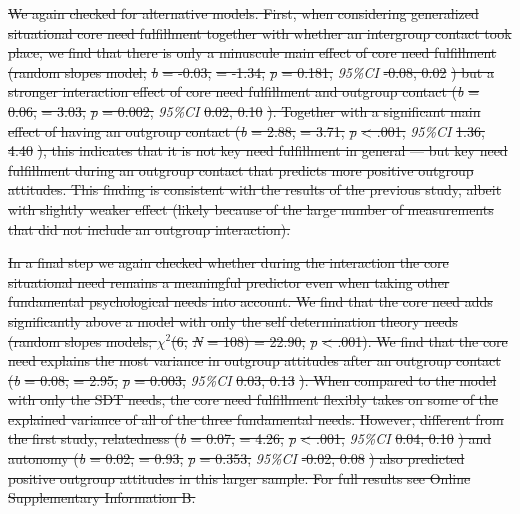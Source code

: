 \documentclass[man, 12pt, a4paper, mask]{apa7} %
\theoremstyle{break}
\theoremstyle{plain}
\providecommand{\DIFdeltex}[1]{{\protect\color{red}\sout{#1}}}                      %
\providecommand{\DIFdel}[1]{\texorpdfstring{\DIFdeltex{#1}}{}} %
\begin{document}
\DIFdel{We again checked for alternative models. First, when considering
generalized situational core need fulfillment together with whether an
intergroup contact took place, we find that there is only a minuscule
main effect of core need fulfillment (random slopes model; }\textit{\DIFdel{b}} %
\DIFdel{=
-0.03, }%
\DIFdel{= -1.34, }\textit{\DIFdel{p}} %
\DIFdel{= 0.181,
}\textit{95\%CI}{%
}%
\DIFdel{-0.08, 0.02}%
\DIFdel{) but a stronger interaction effect of
core need fulfillment and outgroup contact (}\textit{\DIFdel{b}} %
\DIFdel{= 0.06,
}%
\DIFdel{= 3.03, }\textit{\DIFdel{p}} %
\DIFdel{= 0.002, }\textit{95\%CI}{%
}%
\DIFdel{0.02,
0.10}%
\DIFdel{). Together with a significant main effect of having an outgroup
contact (}\textit{\DIFdel{b}} %
\DIFdel{= 2.88, }%
\DIFdel{= 3.71, }\textit{\DIFdel{p}}
\DIFdel{\textless{} .001, }\textit{95\%CI}{%
}%
\DIFdel{1.36, 4.40}%
\DIFdel{), this indicates that
it is not key need fulfillment in general --- but key need fulfillment
during an outgroup contact that predicts more positive outgroup
attitudes. This finding is consistent with the results of the previous
study, albeit with slightly weaker effect (likely because of the large
number of measurements that did not include an outgroup interaction).
}%

\DIFdel{In a final step we again checked whether during the interaction the core
situational need remains a meaningful predictor even when taking other
fundamental psychological needs into account. We find that the core need
adds significantly above a model with only the self determination theory
needs (random slopes models; \(\chi^2\)(6, }\textit{\DIFdel{N}} %
\DIFdel{= 108) = 22.90,
}\textit{\DIFdel{p}} %
\DIFdel{\textless{} .001). We find that the core need explains the
most variance in outgroup attitudes after an outgroup contact
(}\textit{\DIFdel{b}} %
\DIFdel{= 0.08, }%
\DIFdel{= 2.95, }\textit{\DIFdel{p}} %
\DIFdel{= 0.003,
}\textit{95\%CI}{%
}%
\DIFdel{0.03, 0.13}%
\DIFdel{). When compared to the model with only
the SDT needs, the core need fulfillment flexibly takes on some of the
explained variance of all of the three fundamental needs. However,
different from the first study, relatedness (}\textit{\DIFdel{b}} %
\DIFdel{= 0.07,
}%
\DIFdel{= 4.26, }\textit{\DIFdel{p}} %
\DIFdel{\textless{} .001,
}\textit{95\%CI}{%
}%
\DIFdel{0.04, 0.10}%
\DIFdel{) and autonomy (}\textit{\DIFdel{b}} %
\DIFdel{= 0.02,
}%
\DIFdel{= 0.93, }\textit{\DIFdel{p}} %
\DIFdel{= 0.353, }\textit{95\%CI}{%
}%
\DIFdel{-0.02,
0.08}%
\DIFdel{) also predicted positive outgroup attitudes in this larger
sample. For full results see Online Supplementary Information B.
}%
\end{document}
